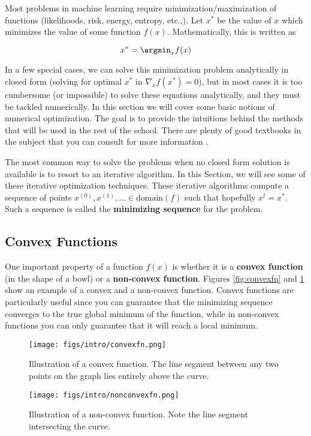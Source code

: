 

Most problems in machine learning require minimization/maximization of functions (likelihoods, risk, energy, entropy, etc.,). Let $x^*$ be the value of $x$ which minimizes the value of some function $f(x)$. Mathematically, this is written as

\begin{equation*}
x^* = \argmin_x f(x)
\end{equation*}

In a few special cases, we can solve this minimization problem analytically in closed form (solving for optimal $x^{*}$ in  $\nabla_{x}f(x^{*})=0$), 
but in most cases it is too cumbersome (or impossible) to solve these equations analytically, and they must be tackled numerically. In this section we will cover some basic notions of numerical optimization. The goal is to provide the intuitions behind the methods that will be used in the rest of the school. There are plenty of good textbooks in the subject that you can consult for more information \citep{Nocedal1999,bertsekas1995np,boyd2004convex}.

The most common way to solve the problems when no closed form solution is available is to resort to an iterative algorithm. In this Section, we will see some 
of these iterative optimization techniques. These iterative algorithms compute a sequence of points $x^{(0)},x^{(1)},\ldots \in \text{domain}(f)$ such that hopefully $x^t = x^*$.
Such a sequence is called the {\bf minimizing sequence} for the problem.


\subsection{Convex Functions}

One important property of a function $f(x)$ is whether it is a \textbf{convex function} (in the shape of a bowl) or a \textbf{non-convex function}. Figures \ref{fig:convexfn} and \ref{fig:nonconvexfn} show an example of a convex and a non-convex function. Convex functions are particularly useful since you can guarantee that the minimizing sequence converges to the true global minimum of the function, while in non-convex functions you can only guarantee that it will reach a local minimum. 


 \begin{figure}[h]
 \begin{center}
     \texttt{[image: figs/intro/convexfn.png]}
   \caption{\label{fig:convexfn} Illustration of a convex function. The line segment between any two points on the graph lies entirely above the curve.} 
     \texttt{[image: figs/intro/nonconvexfn.png]}
   \caption{\label{fig:nonconvexfn} Illustration of a non-convex function. Note the line segment intersecting the curve. } 
 \end{center}
 \end{figure}


